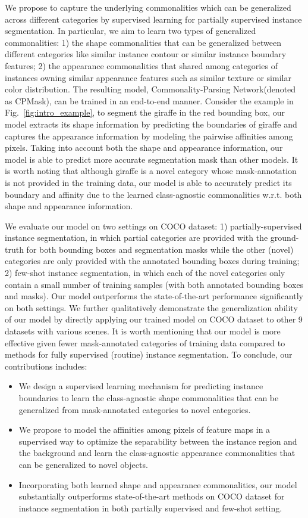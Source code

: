 \documentclass[runningheads]{llncs}
\newcommand{\mymodel}{Commonality-Parsing Network\xspace}
\begin{document}
We propose to capture the underlying commonalities which can be generalized across different categories by supervised learning for partially supervised instance segmentation. In particular, we aim to learn two types of generalized commonalities: 1) the shape commonalities that can be generalized between different categories like similar instance contour or similar instance boundary features; 2) the appearance commonalities that shared among categories of instances owning similar appearance features such as similar texture or similar color distribution. 
The resulting model, \mymodel (denoted as CPMask), can be trained in an end-to-end manner. Consider the example in Fig.~\ref{fig:intro_example}, to segment the giraffe in the red bounding box, our model extracts its shape information by predicting the boundaries of giraffe and captures the appearance information by modeling the pairwise affinities among pixels. Taking into account both the shape and appearance information, our model is able to predict more accurate segmentation mask than other models. It is worth noting that although giraffe is a novel category whose mask-annotation is not provided in the training data, our model is able to accurately predict its boundary and affinity due to the learned class-agnostic commonalities w.r.t. both shape and appearance information. 

We evaluate our model on two settings on COCO dataset: 1) partially-supervised instance segmentation, in which partial categories are provided with the ground-truth for both bounding boxes and segmentation masks while the other (novel) categories are only provided with the annotated bounding boxes during training; 2) few-shot instance segmentation, in which each of the novel categories only contain a small number of training samples (with both annotated bounding boxes and masks). Our model outperforms the state-of-the-art performance significantly on both settings. We further qualitatively demonstrate the generalization ability of our model by directly applying our trained model on COCO dataset to other 9 datasets with various scenes.
It is worth mentioning that our model is more effective given fewer mask-annotated categories of training data compared to methods for fully supervised (routine) instance segmentation.
To conclude, our contributions includes:
\vspace{-5pt}
\begin{itemize}
    \item We design a supervised learning mechanism for predicting instance boundaries to learn the class-agnostic shape commonalities that can be generalized from mask-annotated categories to novel categories. 
    \item We propose to model the affinities among pixels of feature maps in a supervised way to optimize the separability between the instance region and the background and learn the class-agnostic appearance commonalities that can be generalized to novel objects. \item Incorporating both learned shape and appearance commonalities, our model substantially outperforms state-of-the-art methods on COCO dataset for instance segmentation in both partially supervised and few-shot setting. \end{itemize}
\end{document}
